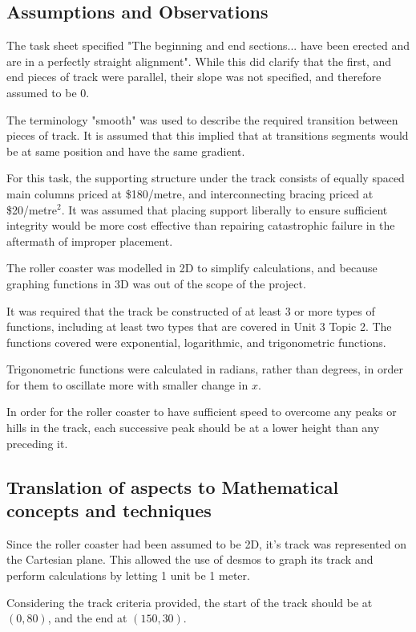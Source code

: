 \documentclass[11pt, letterpaper]{article}
\begin{document}
\subsection{Assumptions and Observations}

The task sheet specified "The beginning and end sections... have been erected and are in a perfectly straight alignment". While this did clarify that the first, and end pieces of track were parallel, their slope was not specified, and therefore assumed to be 0.

The terminology "smooth" was used to describe the required transition between pieces of track. It is assumed that this implied that at transitions segments would be at same position and have the same gradient.

For this task, the supporting structure under the track consists of equally spaced main columns priced at \$180/metre, and interconnecting bracing priced at \$20/metre$^2$. It was assumed that placing support liberally to ensure sufficient integrity would be more cost effective than repairing catastrophic failure in the aftermath of improper placement.

The roller coaster was modelled in 2D to simplify calculations, and because graphing functions in 3D was out of the scope of the project. 
		
It was required that the track be constructed of at least 3 or more types of functions, including at least two types that are covered in Unit 3 Topic 2. The functions covered were exponential, logarithmic, and trigonometric functions.
	
Trigonometric functions were calculated in radians, rather than degrees, in order for them to oscillate more with smaller change in $x$.

In order for the roller coaster to have sufficient speed to overcome any peaks or hills in the track, each successive peak should be at a lower height than any preceding it.


\subsection{Translation of aspects to Mathematical concepts and techniques}

Since the roller coaster had been assumed to be 2D, it's track was represented on the Cartesian plane. This allowed the use of desmos to graph its track and perform calculations by letting 1 unit be 1 meter. 

Considering the track criteria provided, the start of the track should be at $(0, 80)$, and the end at $(150, 30)$.
\end{document}

